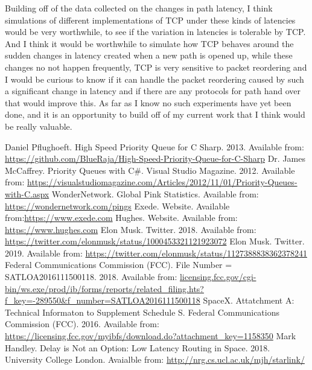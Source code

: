 \documentclass[12pt,a4paper,twoside,openright]{report}
\begin{document}
Building off of the data collected on the changes in path latency, I think simulations of different implementations of TCP under these kinds of latencies would be very worthwhile, to see if the variation in latencies is tolerable by TCP. And I think it would be worthwhile to simulate how TCP behaves around the sudden changes in latency created when a new path is opened up, while these changes no not happen frequently, TCP is very sensitive to packet reordering and I would be curious to know if it can handle the packet reordering caused by such a significant change in latency and if there are any protocols for path hand over that would improve this. As far as I know no such experiments have yet been done, and it is an opportunity to build off of my current work that I think would be really valuable.

\begin{thebibliography}{99}
	 Daniel Pflughoeft. High Speed Priority Queue for C Sharp.
	2013. Available from:  \url{https://github.com/BlueRaja/High-Speed-Priority-Queue-for-C-Sharp}
	 Dr. James McCaffrey. Priority Queues with C\#. 
	Visual Studio Magazine. 2012. Available from: \url{https://visualstudiomagazine.com/Articles/2012/11/01/Priority-Queues-with-C.aspx}
	 WonderNetwork. Global Pink Statistics. 
	Available from: \url{https://wondernetwork.com/pings}
	 Exede. Website.
	Available from:\url{https://www.exede.com}
	 Hughes. Website.
	Available from: \url{https://www.hughes.com}
	 Elon Musk. Twitter.
	2018. Available from: \url{https://twitter.com/elonmusk/status/1000453321121923072}
	 Elon Musk. Twitter.
	2019. Available from: \url{https://twitter.com/elonmusk/status/1127388838362378241}
	 Federal Communications Commission (FCC). File Number = SATLOA2016111500118.
	2018. Available from: \url{licensing.fcc.gov/cgi-bin/ws.exe/prod/ib/forms/reports/related_filing.hts?f_key=-289550&f_number=SATLOA2016111500118}
	 SpaceX. Attatchment A: Technical Informaton to Supplement Schedule S.
	Federal Communications Commission (FCC). 2016. Available from: \url{https://licensing.fcc.gov/myibfs/download.do?attachment_key=1158350}
	 Mark Handley. Delay is Not an Option: Low Latency Routing in Space.
	2018. University College London. Avaialble from: \url{http://nrg.cs.ucl.ac.uk/mjh/starlink/}

\end{thebibliography}
\end{document}
